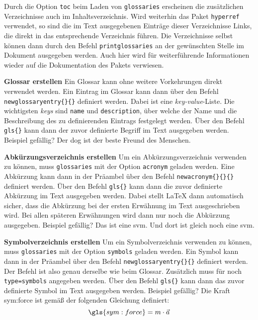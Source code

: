 Durch die Option \texttt{toc} beim Laden von \texttt{glossaries} erscheinen
die zusätzlichen Verzeichnisse auch im Inhaltsverzeichnis. Wird weiterhin
das Paket \texttt{hyperref} verwendet, so sind die im Text ausgegebenen
Einträge dieser Verzeichnisse Links, die direkt in das entsprechende 
Verzeichnis führen. Die Verzeichnisse selbst können dann durch den Befehl
\texttt{\tb printglossaries} an der gewünschten Stelle im Dokument ausgegeben
werden. Auch hier wird für weiterführende Informationen wieder auf die
Dokumentation des Pakets verwiesen.

\textbf{Glossar erstellen}
Ein Glossar kann ohne weitere Vorkehrungen direkt verwendet werden.
Ein Eintrag im Glossar kann dann über den Befehl
\texttt{\tb newglossaryentry\{\}\{\}}
definiert werden. Dabei ist  eine \emph{key-value}-Liste.
Die wichtigsten \emph{keys} sind \texttt{name} und \texttt{description}, über 
welche
der Name und die Beschreibung des zu definierenden Eintrags festgelegt werden.
Über den Befehl \texttt{\tb gls\{\}} kann dann der zuvor
definierte Begriff im Text ausgegeben werden. Beispiel gefällig? Der
\gls{dog} ist der beste Freund des Menschen.


\textbf{Abkürzungsverzeichnis erstellen}
Um ein Abkürzungsverzeichnis verwenden zu können, muss \texttt{glossaries} mit 
der Option
\texttt{acronym} geladen werden. Eine Abkürzung kann dann in der Präambel über 
den Befehl \texttt{\tb newacronym\{\}\{\}\{\}}  definiert werden. Über den Befehl
\texttt{\tb gls\{\}} kann dann die zuvor definierte Abkürzung
im Text ausgegeben werden. Dabei stellt \LaTeX{} dann automatisch sicher, dass
die Abkürzung bei der ersten Erwähnung im Text ausgeschrieben wird. Bei allen
späteren Erwähnungen wird dann nur noch die Abkürzung ausgegeben. Beispiel
gefällig? Das ist eine \gls{svm}. Und dort ist gleich noch eine \gls{svm}. 

\textbf{Symbolverzeichnis erstellen}
Um ein Symbolverzeichnis verwenden zu können, muss \texttt{glossaries} mit
der Option \texttt{symbols} geladen werden. Ein Symbol kann dann in der 
Präambel über den Befehl
\texttt{\tb newglossaryentry\{\}\{\}}
definiert werden. Der Befehl ist also genau derselbe wie beim Glossar.
Zusätzlich muss für  noch \texttt{type=symbols} angegeben
werden. Über den Befehl \texttt{\tb gls\{\}} kann dann das zuvor
definierte Symbol im Text ausgegeben werden. Beispiel gefällig? Die Kraft \gls{sym:force} ist gemäß der folgenden Gleichung definiert:
\begin{equation*}
	\gls{sym:force}=m\cdot \vec{a}
\end{equation*}


